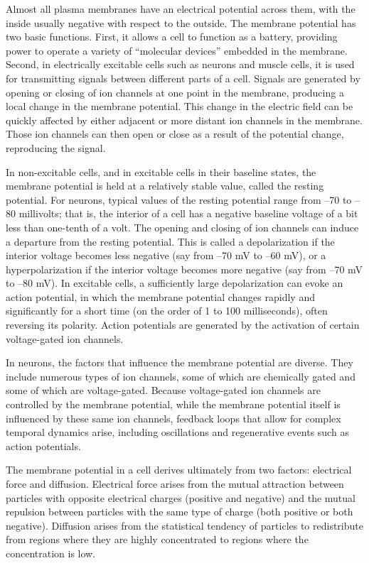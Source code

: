 Almost all plasma membranes have an electrical potential across them, with the inside usually negative with respect to the outside. The membrane potential has two basic functions. First, it allows a cell to function as a battery, providing power to operate a variety of ``molecular devices'' embedded in the membrane. Second, in electrically excitable cells such as neurons and muscle cells, it is used for transmitting signals between different parts of a cell. Signals are generated by opening or closing of ion channels at one point in the membrane, producing a local change in the membrane potential. This change in the electric field can be quickly affected by either adjacent or more distant ion channels in the membrane. Those ion channels can then open or close as a result of the potential change, reproducing the signal.

In non-excitable cells, and in excitable cells in their baseline states, the membrane potential is held at a relatively stable value, called the resting potential. For neurons, typical values of the resting potential range from --70 to --80 millivolts; that is, the interior of a cell has a negative baseline voltage of a bit less than one-tenth of a volt. The opening and closing of ion channels can induce a departure from the resting potential. This is called a depolarization if the interior voltage becomes less negative (say from --70 mV to --60 mV), or a hyperpolarization if the interior voltage becomes more negative (say from --70 mV to --80 mV). In excitable cells, a sufficiently large depolarization can evoke an action potential, in which the membrane potential changes rapidly and significantly for a short time (on the order of 1 to 100 milliseconds), often reversing its polarity. Action potentials are generated by the activation of certain voltage-gated ion channels.

In neurons, the factors that influence the membrane potential are diverse. They include numerous types of ion channels, some of which are chemically gated and some of which are voltage-gated. Because voltage-gated ion channels are controlled by the membrane potential, while the membrane potential itself is influenced by these same ion channels, feedback loops that allow for complex temporal dynamics arise, including oscillations and regenerative events such as action potentials.

The membrane potential in a cell derives ultimately from two factors: electrical force and diffusion. Electrical force arises from the mutual attraction between particles with opposite electrical charges (positive and negative) and the mutual repulsion between particles with the same type of charge (both positive or both negative). Diffusion arises from the statistical tendency of particles to redistribute from regions where they are highly concentrated to regions where the concentration is low.

